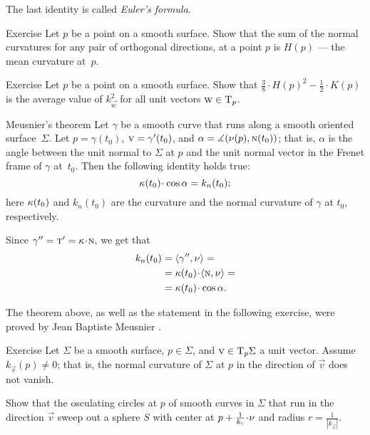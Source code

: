 The last identity is called \emph{Euler's formula}.

\begin{thm}{Exercise}\label{ex:mean-curvature}
Let $p$ be a point on a smooth surface.
Show that the sum of the normal curvatures for any pair of orthogonal directions, at a point $p$ is $H(p)$ --- the mean curvature at~$p$. 
\end{thm}

\begin{thm}{Exercise}\label{ex:average}
Let $p$ be a point on a smooth surface.
Show that $\tfrac38\cdot H(p)^2-\tfrac12\cdot K(p)$ is the average value of $k_{\vec w}^2$ for all unit vectors ${\text{\sc{w}}}\in\mathrm{T}_p$.
\end{thm}



\begin{thm}{Meusnier's theorem}
\label{thm:meusnier}
Let $\gamma$ be a smooth curve that runs along a smooth oriented surface~$\Sigma$.
Let $p=\gamma(t_0)$, ${\vec v}\z=\gamma'(t_0)$, and $\alpha\z=\measuredangle(\Norm(p),\norm(t_0))$;
that is, $\alpha$ is the angle between the unit normal to $\Sigma$ at $p$ and the unit normal vector in the Frenet frame of $\gamma$ at~$t_0$.
Then the following identity holds true: 
\[\kur(t_0)\cdot\cos\alpha=k_{n}(t_0);\]
here $\kappa(t_0)$ and $k_n(t_0)$ are the curvature and the normal curvature of $\gamma$ at $t_0$, respectively. 
\end{thm}


 Since $\gamma''=\tan'=\kur\cdot \norm$, we get that
\begin{align*}
k_{n}(t_0)&=\langle\gamma'',\Norm\rangle=
\\
&=\kur(t_0)\cdot\langle\norm,\Norm\rangle=
\\
&=\kur(t_0)\cdot\cos\alpha.
\end{align*}
\qedsf

The theorem above, as well as the statement in the following exercise, were proved by Jean Baptiste Meusnier \cite{meusnier}.

\begin{thm}{Exercise}\label{ex:meusnier}
Let $\Sigma$ be a smooth surface, $p\in\Sigma$, and ${\text{\sc{v}}}\in \mathrm{T}_p\Sigma$ a unit vector.
Assume $k_{\vec v}(p)\ne 0$; that is, the normal curvature of $\Sigma$ at $p$ in the direction of ${\vec v}$ does not vanish.

Show that the osculating circles at $p$ of smooth curves in $\Sigma$ that run in the direction ${\vec v}$ sweep out a sphere $S$ with center at $p+\tfrac1{k_{\vec v}}\cdot\Norm$ and radius $r=\tfrac1{|k_{\vec v}|}$.
\end{thm}

